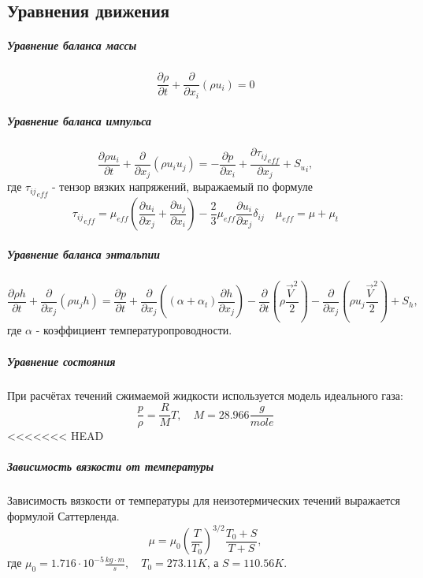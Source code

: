 \subsection{Уравнения движения}
		\subparagraph{Уравнение баланса массы\\}
			\begin{equation}
				\frac{\partial \rho}{\partial t} + \frac{\partial}{\partial x_i}(\rho u_i) = 0
			\end{equation}
		\subparagraph{Уравнение баланса импульса\\}
			\begin{equation}
				\frac{\partial \rho u_i}{\partial t} + \frac{\partial}{\partial x_j}(\rho u_iu_j) = - \frac{\partial p}{\partial x_i} + \frac{\partial {\tau_{ij}}_{eff}}{\partial x_j} + {S_u}_i,
				\label{flowEqn}
			\end{equation}
			где ${\tau_{ij}}_{eff}$ - тензор вязких напряжений, выражаемый по формуле
			\begin{equation}
				{\tau_{ij}}_{eff} = \mu_{eff}\left( \frac{\partial u_i}{\partial x_j} + \frac{\partial u_j}{\partial x_i} \right) - \frac{2}{3}\mu_{eff}\frac{\partial u_i}{\partial x_j} \delta_{ij} \quad \mu_{eff} = \mu + \mu_{t}
			\end{equation}
		\subparagraph{Уравнение баланса энтальпии\\}
		\begin{equation}
			\frac{\partial \rho h}{\partial t} + \frac{\partial}{\partial x_j} (\rho u_j h) = \frac{\partial p}{\partial t} + \frac{\partial}{\partial x_j} \left((\alpha + \alpha_t) \frac{\partial h}{\partial x_j}\right) - \frac{\partial}{\partial t}\left(\rho \frac{\vec{V}^2}{2}\right) - \frac{\partial}{\partial x_j}\left(\rho u_j \frac{\vec{V}^2}{2}\right) + S_h,
			\label{thermoEqn}
		\end{equation}
		 где $\alpha$ - коэффициент температуропроводности.
		\subparagraph{Уравнение состояния\\}
			\hspace{2em}При расчётах течений сжимаемой жидкости используется модель идеального газа:
			\begin{equation}
				\frac{p}{\rho} = \frac{R}{M}T, \quad M = 28.966 \frac{g}{mole}
			\end{equation}
<<<<<<< HEAD
		\subparagraph{Зависимость вязкости от температуры\\}
				\hspace{2em}Зависимость вязкости от температуры для неизотермических течений выражается формулой Саттерленда.
				\begin{equation}
					\mu = \mu_0 \left(\frac{T}{T_0}\right)^{3/2} \frac{T_0 + S}{T + S},
				\end{equation}
					где $\mu_0 = 1.716 \cdot 10^{-5} \frac{kg \cdot m}{s}, \quad T_0 = 273.11 K$, а $S=110.56 K$.
					
